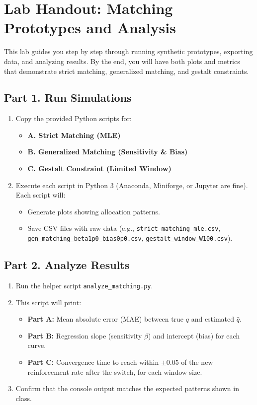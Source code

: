 \section{Lab Handout: Matching Prototypes and Analysis}

This lab guides you step by step through running synthetic prototypes, exporting
data, and analyzing results. By the end, you will have both plots and metrics
that demonstrate strict matching, generalized matching, and gestalt constraints.

\subsection*{Part 1. Run Simulations}
\begin{enumerate}[leftmargin=*]
  \item Copy the provided Python scripts for:
    \begin{itemize}
      \item \textbf{A. Strict Matching (MLE)}
      \item \textbf{B. Generalized Matching (Sensitivity \& Bias)}
      \item \textbf{C. Gestalt Constraint (Limited Window)}
    \end{itemize}
  \item Execute each script in Python 3 (Anaconda, Miniforge, or Jupyter are
  fine). Each script will:
    \begin{itemize}
      \item Generate plots showing allocation patterns.
      \item Save CSV files with raw data (e.g., \texttt{strict\_matching\_mle.csv},
      \texttt{gen\_matching\_beta1p0\_bias0p0.csv}, \texttt{gestalt\_window\_W100.csv}).
    \end{itemize}
\end{enumerate}

\subsection*{Part 2. Analyze Results}
\begin{enumerate}[leftmargin=*]
  \item Run the helper script \texttt{analyze\_matching.py}.
  \item This script will print:
    \begin{itemize}
      \item \textbf{Part A:} Mean absolute error (MAE) between true $q$ and estimated $\hat{q}$.
      \item \textbf{Part B:} Regression slope (sensitivity $\beta$) and intercept (bias) for each curve.
      \item \textbf{Part C:} Convergence time to reach within $\pm 0.05$ of the new reinforcement rate after the switch, for each window size.
    \end{itemize}
  \item Confirm that the console output matches the expected patterns shown in class.
\end{enumerate}

